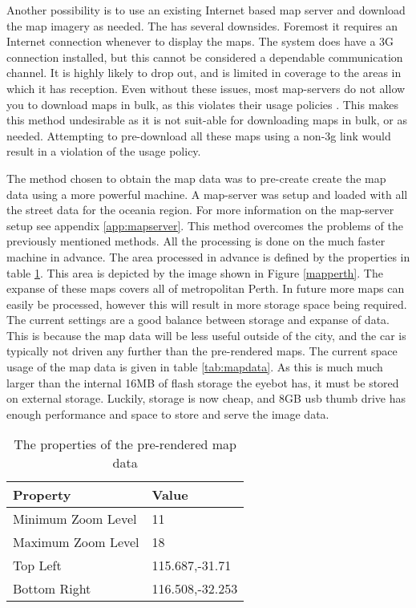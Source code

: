 Another possibility is to use an existing Internet based map server and download the map imagery as needed. The has several downsides. Foremost it requires an Internet connection whenever to display the maps. The system does have a 3G connection installed, but this cannot be considered a dependable communication channel. It is highly likely to drop out, and is limited in coverage to the areas in which it has reception. Even without these issues, most map-servers do not allow you to download maps in bulk, as this violates their usage policies \cite{tile_usage_policy}. This makes this method undesirable as it is not suit-able for downloading maps in bulk, or as needed. Attempting to pre-download all these maps using a non-3g link would result in a violation of the usage policy.

The method chosen to obtain the map data was to pre-create create the map data using a more powerful machine. A map-server was setup and loaded with all the street data for the oceania region. For more information on the map-server setup see appendix \ref{app:mapserver}. This method overcomes the problems of the previously mentioned methods. All the processing is done on the much faster machine in advance. The area processed in advance is defined by the properties in table \ref{tab:mapbbox}. This area is depicted by the image shown in Figure \ref{mapperth}. The expanse of these maps covers all of metropolitan Perth. In future more maps can easily be processed, however this will result in more storage space being required. The current settings are a good balance between storage and expanse of data. This is because the map data will be less useful outside of the city, and the car is typically not driven any further than the pre-rendered maps. The current space usage of the map data is given in table \ref{tab:mapdata}. As this is much much larger than the internal 16MB of flash storage the eyebot has, it must be stored on external storage. Luckily, storage is now cheap, and 8GB usb thumb drive has enough performance and space to store and serve the image data.

\begin{table}[htdp]
\begin{center}
	
   \begin{tabular}{|l|l|}
        \hline
        Property           & Value           \\ \hline
        Minimum Zoom Level & 11              \\ 
        Maximum Zoom Level & 18              \\ 
        Top Left           & 115.687,-31.71  \\ 
        Bottom Right       & 116.508,-32.253 \\
        \hline
    \end{tabular}
	\caption[Properties of the pre-rendered map data]{The properties of the pre-rendered map data}
	\label{tab:mapbbox} 
\end{center}
\end{table}

